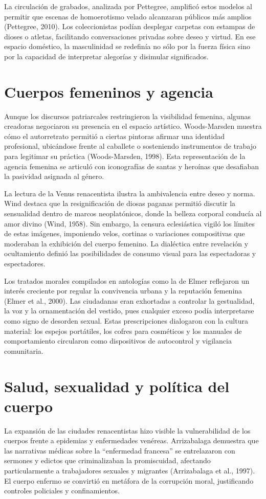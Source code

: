 La circulación de grabados, analizada por Pettegree, amplificó estos modelos al permitir que escenas de homoerotismo velado alcanzaran públicos más amplios (Pettegree, 2010). Los coleccionistas podían desplegar carpetas con estampas de dioses o atletas, facilitando conversaciones privadas sobre deseo y virtud. En ese espacio doméstico, la masculinidad se redefinía no sólo por la fuerza física sino por la capacidad de interpretar alegorías y disimular significados.

\section{Cuerpos femeninos y agencia}
Aunque los discursos patriarcales restringieron la visibilidad femenina, algunas creadoras negociaron su presencia en el espacio artístico. Woods-Marsden muestra cómo el autorretrato permitió a ciertas pintoras afirmar una identidad profesional, ubicándose frente al caballete o sosteniendo instrumentos de trabajo para legitimar su práctica (Woods-Marsden, 1998). Esta representación de la agencia femenina se articuló con iconografías de santas y heroínas que desafiaban la pasividad asignada al género.

La lectura de la Venus renacentista ilustra la ambivalencia entre deseo y norma. Wind destaca que la resignificación de diosas paganas permitió discutir la sensualidad dentro de marcos neoplatónicos, donde la belleza corporal conducía al amor divino (Wind, 1958). Sin embargo, la censura eclesiástica vigiló los límites de estas imágenes, imponiendo velos, cortinas o variaciones compositivas que moderaban la exhibición del cuerpo femenino. La dialéctica entre revelación y ocultamiento definió las posibilidades de consumo visual para las espectadoras y espectadores.

Los tratados morales compilados en antologías como la de Elmer reflejaron un interés creciente por regular la convivencia urbana y la reputación femenina (Elmer et al., 2000). Las ciudadanas eran exhortadas a controlar la gestualidad, la voz y la ornamentación del vestido, pues cualquier exceso podía interpretarse como signo de desorden sexual. Estas prescripciones dialogaron con la cultura material: los espejos portátiles, los cofres para cosméticos y los manuales de comportamiento circularon como dispositivos de autocontrol y vigilancia comunitaria.

\section{Salud, sexualidad y política del cuerpo}
La expansión de las ciudades renacentistas hizo visible la vulnerabilidad de los cuerpos frente a epidemias y enfermedades venéreas. Arrizabalaga demuestra que las narrativas médicas sobre la “enfermedad francesa” se entrelazaron con sermones y edictos que criminalizaban la promiscuidad, afectando particularmente a trabajadores sexuales y migrantes (Arrizabalaga et al., 1997). El cuerpo enfermo se convirtió en metáfora de la corrupción moral, justificando controles policiales y confinamientos.

